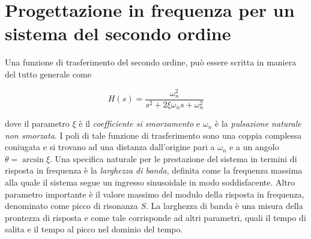 \section{Progettazione in frequenza per un sistema del secondo ordine}
	\label{app:sistemaSecondoordine}
	
	Una funzione di trasferimento del secondo ordine, può essere scritta in maniera del tutto generale come
	
	\begin{equation}
		H(s)=\frac{\omega_n^2}{s^2 + 2\xi \omega_ns + \omega_n^2}
		\label{eq:secondoOrdine}
	\end{equation}
	
	\noindent dove il parametro $\xi$ è il \textit{coefficiente si smorzamento} e $\omega_n$ è la \textit{pulsazione naturale non smorzata}. I poli di tale funzione di trasferimento sono una coppia complessa coniugata e si trovano ad una distanza dall'origine pari a $\omega_n$ e a un angolo $\theta=\arcsin\xi$. Una specifica naturale per le prestazione del sistema in termini di risposta in frequenza è la \textit{larghezza di banda}, definita come la frequenza massima alla quale il  sistema segue un ingresso sinusoidale in modo soddisfacente. Altro parametro importante è il valore massimo del modulo della  risposta in frequenza, denominato come picco di risonanza $S$. La larghezza di banda è una misura della prontezza di risposta e come tale corrisponde ad altri parametri, quali il tempo di salita e il tempo al picco nel dominio del tempo.
	
